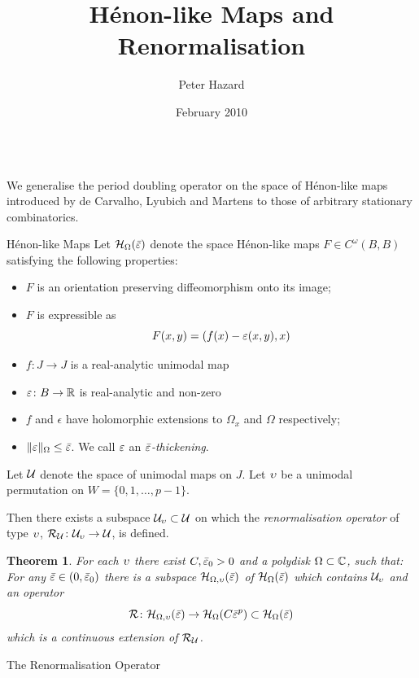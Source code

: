 \documentclass[final,hyperref={pdfpagelabels=false}]{beamer}
\title[H\'enon Renormalisation]{H\'enon-like Maps and Renormalisation}
\author[Peter Hazard]{Peter Hazard}
\institute[IME-USP, S\~ao Paulo]{Instituto do Mathematics e \'Estatistica, Universidade de S\~ao Paulo}
\date{February 2010}
\theoremstyle{plain}%
\newtheorem{thm}{Theorem}
\theoremstyle{definition}
\theoremstyle{remark}
\begin{document}
\begin{frame}{}
\begin{columns}[t]
\begin{column}{0.3\linewidth}
\begin{block}{\maketitle}

We generalise the period doubling operator on the space of H\'enon-like maps introduced by de Carvalho, Lyubich and Martens to those of arbitrary stationary combinatorics.

\end{block}
\begin{block}{H\'enon-like Maps}
Let $\mathcal H_\Omega(\bar{\varepsilon})$ denote the space H\'enon-like maps $F\in C^\omega(B,B)$ satisfying the following properties:
\begin{itemize}
\item $F$ is an orientation preserving diffeomorphism onto its image;
\item $F$ is expressible as
\begin{equation}
F(x,y)=(f(x)-\varepsilon(x,y),x)
\end{equation}
\item $f\colon J\to J$ is a real-analytic unimodal map 
\item $\varepsilon\colon B\to\mathbb{R}$ is real-analytic and non-zero
\item $f$ and $\epsilon$ have holomorphic extensions to $\Omega_x$ and $\Omega$ respectively;
\item $\|\varepsilon\|_\Omega\leq \bar{\varepsilon}$. We call $\varepsilon$ an \emph{$\bar{\varepsilon}$-thickening}.
\end{itemize}
\vskip 20pt

Let $\mathcal U$ denote the space of unimodal maps on $J$. Let $\upsilon$ be a unimodal permutation on $W=\{0,1,\ldots, p-1\}$. 

\vskip 20pt

Then there exists a subspace $\mathcal U_{\upsilon}\subset\mathcal U$ on which the \emph{renormalisation operator} of type $\upsilon$, $\mathcal{R}_\mathcal{U}\colon \mathcal U_{\upsilon}\to\mathcal U$, is defined.

\vskip 25pt

\begin{thm}\label{R-construction}
For each $\upsilon$ there exist $C,\bar{\varepsilon}_0>0$ and a polydisk $\Omega\subset\mathbb{C}$, such that: 
For any $\bar{\varepsilon}\in(0,\bar{\varepsilon}_0)$ there is a subspace $\mathcal H_{\Omega,\upsilon}(\bar{\varepsilon})$ of $\mathcal H_{\Omega}(\bar{\varepsilon})$ which contains $\mathcal U_{\upsilon}$ and an operator 
\[\mathcal{R}\colon \mathcal H_{\Omega,\upsilon}(\bar{\varepsilon})\to \mathcal H_{\Omega}(C\bar{\varepsilon}^p)\subset \mathcal H_{\Omega}(\bar{\varepsilon})\]
which is a continuous extension of $\mathcal{R}_\mathcal{U}$.
\end{thm}
\end{block}
\begin{block}{The Renormalisation Operator}


\end{block}
\end{column}
\end{columns}
\end{frame}
\end{document}
